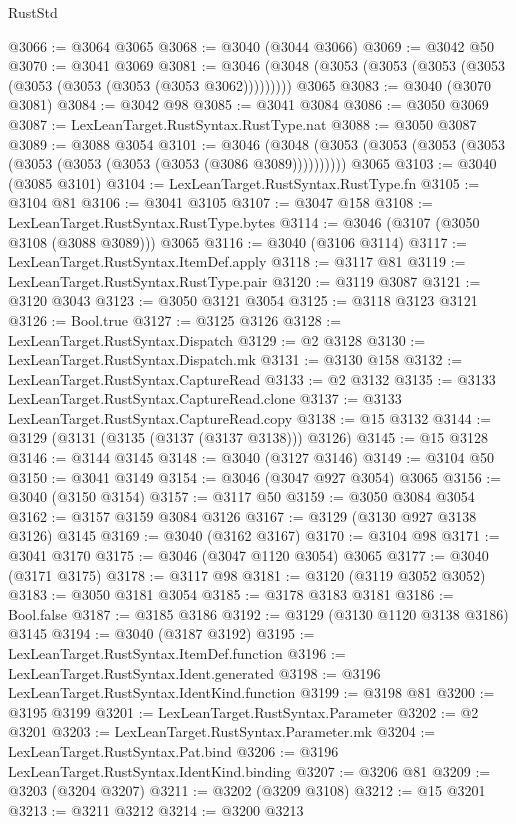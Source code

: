 \begin{lexlean}{RustStd}
\begin{coremodule}
@3066 := @3064 @3065
@3068 := @3040 (@3044 @3066)
@3069 := @3042 @50
@3070 := @3041 @3069
@3081 := @3046 (@3048 (@3053 (@3053 (@3053 (@3053 (@3053 (@3053 (@3053 (@3053 @3062))))))))) @3065
@3083 := @3040 (@3070 @3081)
@3084 := @3042 @98
@3085 := @3041 @3084
@3086 := @3050 @3069
@3087 := LexLeanTarget.RustSyntax.RustType.nat
@3088 := @3050 @3087
@3089 := @3088 @3054
@3101 := @3046
    (@3048 (@3053 (@3053 (@3053 (@3053 (@3053 (@3053 (@3053 (@3053 (@3086 @3089))))))))))
    @3065
@3103 := @3040 (@3085 @3101)
@3104 := LexLeanTarget.RustSyntax.RustType.fn
@3105 := @3104 @81
@3106 := @3041 @3105
@3107 := @3047 @158
@3108 := LexLeanTarget.RustSyntax.RustType.bytes
@3114 := @3046 (@3107 (@3050 @3108 (@3088 @3089))) @3065
@3116 := @3040 (@3106 @3114)
@3117 := LexLeanTarget.RustSyntax.ItemDef.apply
@3118 := @3117 @81
@3119 := LexLeanTarget.RustSyntax.RustType.pair
@3120 := @3119 @3087
@3121 := @3120 @3043
@3123 := @3050 @3121 @3054
@3125 := @3118 @3123 @3121
@3126 := Bool.true
@3127 := @3125 @3126
@3128 := LexLeanTarget.RustSyntax.Dispatch
@3129 := @2 @3128
@3130 := LexLeanTarget.RustSyntax.Dispatch.mk
@3131 := @3130 @158
@3132 := LexLeanTarget.RustSyntax.CaptureRead
@3133 := @2 @3132
@3135 := @3133 LexLeanTarget.RustSyntax.CaptureRead.clone
@3137 := @3133 LexLeanTarget.RustSyntax.CaptureRead.copy
@3138 := @15 @3132
@3144 := @3129 (@3131 (@3135 (@3137 (@3137 @3138))) @3126)
@3145 := @15 @3128
@3146 := @3144 @3145
@3148 := @3040 (@3127 @3146)
@3149 := @3104 @50
@3150 := @3041 @3149
@3154 := @3046 (@3047 @927 @3054) @3065
@3156 := @3040 (@3150 @3154)
@3157 := @3117 @50
@3159 := @3050 @3084 @3054
@3162 := @3157 @3159 @3084 @3126
@3167 := @3129 (@3130 @927 @3138 @3126) @3145
@3169 := @3040 (@3162 @3167)
@3170 := @3104 @98
@3171 := @3041 @3170
@3175 := @3046 (@3047 @1120 @3054) @3065
@3177 := @3040 (@3171 @3175)
@3178 := @3117 @98
@3181 := @3120 (@3119 @3052 @3052)
@3183 := @3050 @3181 @3054
@3185 := @3178 @3183 @3181
@3186 := Bool.false
@3187 := @3185 @3186
@3192 := @3129 (@3130 @1120 @3138 @3186) @3145
@3194 := @3040 (@3187 @3192)
@3195 := LexLeanTarget.RustSyntax.ItemDef.function
@3196 := LexLeanTarget.RustSyntax.Ident.generated
@3198 := @3196 LexLeanTarget.RustSyntax.IdentKind.function
@3199 := @3198 @81
@3200 := @3195 @3199
@3201 := LexLeanTarget.RustSyntax.Parameter
@3202 := @2 @3201
@3203 := LexLeanTarget.RustSyntax.Parameter.mk
@3204 := LexLeanTarget.RustSyntax.Pat.bind
@3206 := @3196 LexLeanTarget.RustSyntax.IdentKind.binding
@3207 := @3206 @81
@3209 := @3203 (@3204 @3207)
@3211 := @3202 (@3209 @3108)
@3212 := @15 @3201
@3213 := @3211 @3212
@3214 := @3200 @3213

\end{coremodule}
\end{lexlean}
